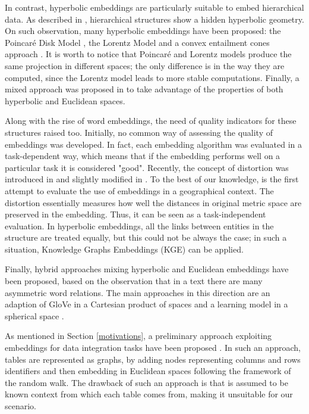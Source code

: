 In contrast, hyperbolic embeddings are particularly suitable to embed hierarchical data. 
As described in \cite{krioukov2010hyperbolic}, hierarchical structures show a hidden hyperbolic geometry. 
On such observation, many hyperbolic embeddings have been proposed: the Poincar\'e Disk Model \cite{NIPS2017_7213}, the Lorentz Model \cite{DBLP:journals/corr/abs-1806-03417} and a convex entailment cones approach \cite{ganea2018hyperbolic}. 
It is worth to notice that Poincar\'e and Lorentz models produce the same projection in different spaces; the only difference is in the way they are computed, since the Lorentz model leads to more stable computations. 
Finally, a mixed approach was proposed in \cite{gu2018learning} to take advantage of the properties of both hyperbolic and Euclidean spaces. 

Along with the rise of word embeddings, the need of quality indicators for these structures raised too. 
Initially, no common way of assessing the quality of embeddings was developed. 
In fact, each embedding algorithm was evaluated in a task-dependent way, which means that if the embedding performs well on a particular task it is considered "good". 
Recently, the concept of distortion was introduced in \cite{sala2018representation} and slightly modified in \cite{dassereto2019evaluating}. 
To the best of our knowledge, \cite{dassereto2019evaluating} is the first attempt to evaluate the use of embeddings in a geographical context. 
The distortion essentially measures how well the distances in original metric space are preserved in the embedding. Thus, it can be seen as a task-independent evaluation. In hyperbolic embeddings, all the links between entities in the structure are treated equally, but this could not be always the case; in such a situation, Knowledge Graphs Embeddings (KGE) can be applied. 

Finally, hybrid approaches mixing hyperbolic and Euclidean embeddings have been proposed, based on the observation that in a text there are many asymmetric word relations. The main approaches in this direction are an adaption of GloVe in a Cartesian product of spaces \cite{tifrea2018poincare} and a learning model in a spherical space \cite{meng2019spherical}.  

As mentioned in Section \ref{motivations}, a preliminary approach exploiting embeddings for data integration tasks have been proposed \cite{cappuzzo2020creating}. In such an approach, tables are represented as graphs, by adding nodes representing columns and rows identifiers and then embedding in Euclidean spaces following the framework of the random walk. The drawback of such an approach is that is assumed to be known context from which each table comes from, making it unsuitable for our scenario.

